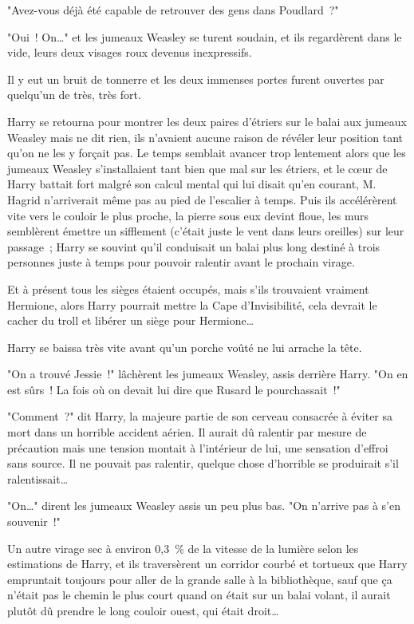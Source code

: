 "Avez-vous déjà été capable de retrouver des gens dans Poudlard~?"

"Oui~! On…" et les jumeaux Weasley se turent soudain, et ils regardèrent dans le vide, leurs deux visages roux devenus inexpressifs.

Il y eut un bruit de tonnerre et les deux immenses portes furent ouvertes par quelqu'un de très, très fort.

Harry se retourna pour montrer les deux paires d'étriers sur le balai aux jumeaux Weasley mais ne dit rien, ils n'avaient aucune raison de révéler leur position tant qu'on ne les y forçait pas. Le temps semblait avancer trop lentement alors que les jumeaux Weasley s'installaient tant bien que mal sur les étriers, et le cœur de Harry battait fort malgré son calcul mental qui lui disait qu'en courant, M. Hagrid n'arriverait même pas au pied de l'escalier à temps. Puis ils accélérèrent vite vers le couloir le plus proche, la pierre sous eux devint floue, les murs semblèrent émettre un sifflement (c'était juste le vent dans leurs oreilles) sur leur passage~; Harry se souvint qu'il conduisait un balai plus long destiné à trois personnes juste à temps pour pouvoir ralentir avant le prochain virage.

Et à présent tous les sièges étaient occupés, mais s'ils trouvaient vraiment Hermione, alors Harry pourrait mettre la Cape d'Invisibilité, cela devrait le cacher du troll et libérer un siège pour Hermione…

Harry se baissa très vite avant qu'un porche voûté ne lui arrache la tête.

"On a trouvé Jessie~!" lâchèrent les jumeaux Weasley, assis derrière Harry. "On en est sûrs~! La fois où on devait lui dire que Rusard le pourchassait~!"

"Comment~?" dit Harry, la majeure partie de son cerveau consacrée à éviter sa mort dans un horrible accident aérien. Il aurait dû ralentir par mesure de précaution mais une tension montait à l'intérieur de lui, une sensation d'effroi sans source. Il ne pouvait pas ralentir, quelque chose d'horrible se produirait s'il ralentissait…

"On…" dirent les jumeaux Weasley assis un peu plus bas. "On n'arrive pas à s'en souvenir~!"

Un autre virage sec à environ 0,3~\% de la vitesse de la lumière selon les estimations de Harry, et ils traversèrent un corridor courbé et tortueux que Harry empruntait toujours pour aller de la grande salle à la bibliothèque, sauf que ça n'était pas le chemin le plus court quand on était sur un balai volant, il aurait plutôt dû prendre le long couloir ouest, qui était droit…

